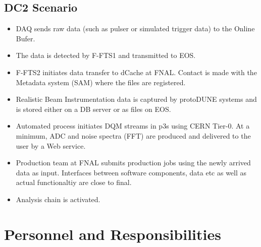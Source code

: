 \documentclass[pdftex,12pt,letter]{article}
\newcommand{\pd}{protoDUNE\xspace}
\begin{document}
\subsection{DC2 Scenario}

\begin{itemize}

\item DAQ sends raw data (such as pulser or simulated trigger data) to the Online Bufer.

\item The data is detected by F-FTS1 and transmitted to EOS.

\item F-FTS2 initiates data transfer to dCache at FNAL. Contact is made with the Metadata system (SAM) where the files
are registered.

\item Realistic Beam Instrumentation data is captured by \pd systems and is stored either on a DB server or as files on EOS.

\item Automated process initiates DQM streams in p3s using  CERN Tier-0. At a minimum, ADC and noise spectra (FFT) are produced
and delivered to the user by a Web service.

\item Production team at FNAL submits production jobs using the newly arrived data as input. Interfaces between software components,
data etc as well as actual functionaltiy are close to final.

\item Analysis chain is activated.

\end{itemize}


\section{Personnel and Responsibilities}
\end{document}
